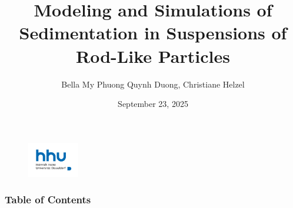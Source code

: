 \documentclass[lightblue, notheorems, xcolor=dvipsnames]{beamer}
\theoremstyle{definition}
\theoremstyle{plain}
\theoremstyle{example}
\begin{document}
  \author{Bella My Phuong Quynh Duong, Christiane Helzel}
  \date{September 23, 2025} %
  \title{Modeling and Simulations of Sedimentation in
  	Suspensions of Rod-Like Particles}
  
  \begin{frame}
  	\titlepage
  	\begin{figure}[htpb]
  		\begin{center}
  			\includegraphics[width=0.2\textwidth]{logo.png}
  		\end{center}
  	\end{figure}
  \end{frame}
\begin{frame}
   \frametitle{Table of Contents}
\tableofcontents %
\end{frame}

\end{document}
